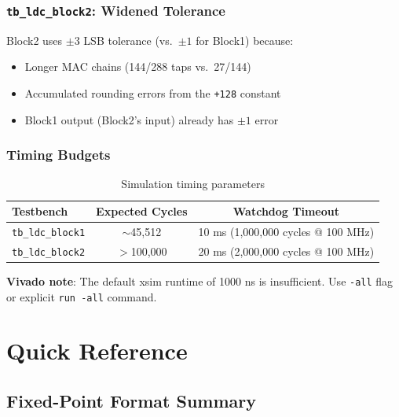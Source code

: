 \documentclass[11pt,a4paper]{report}
\begin{document}
\subsection{\texttt{tb\_ldc\_block2}: Widened Tolerance}

Block2 uses $\pm 3$ LSB tolerance (vs.\ $\pm 1$ for Block1) because:
\begin{itemize}[leftmargin=2em]
    \item Longer MAC chains (144/288 taps vs.\ 27/144)
    \item Accumulated rounding errors from the \texttt{+128} constant
    \item Block1 output (Block2's input) already has $\pm 1$ error
\end{itemize}

\subsection{Timing Budgets}

\begin{table}[h]
\centering
\begin{tabular}{@{}lcc@{}}
\toprule
\textbf{Testbench} & \textbf{Expected Cycles} & \textbf{Watchdog Timeout} \\
\midrule
\texttt{tb\_ldc\_block1} & $\sim$45,512 & 10 ms (1,000,000 cycles @ 100 MHz) \\
\texttt{tb\_ldc\_block2} & $>$100,000 & 20 ms (2,000,000 cycles @ 100 MHz) \\
\bottomrule
\end{tabular}
\caption{Simulation timing parameters}
\end{table}

\textbf{Vivado note}: The default xsim runtime of 1000 ns is insufficient. Use \texttt{-all} flag or explicit \texttt{run -all} command.


\appendix
\chapter{Quick Reference}

\section{Fixed-Point Format Summary}
\end{document}
